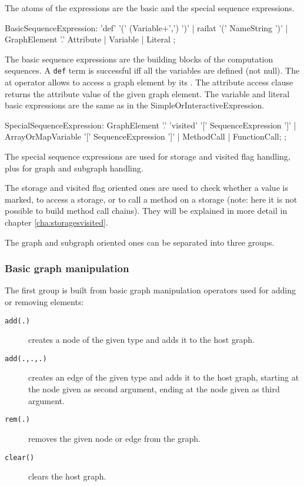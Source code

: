 The atoms of the expressions are the basic and the special sequence expressions.

\begin{rail}
  BasicSequenceExpression:
    'def' '(' (Variable+',') ')' |
	  railat '(' NameString ')' |
 	  GraphElement '.' Attribute |
	  Variable | 
    Literal
  ;
\end{rail}

The basic sequence expressions are the building blocks of the computation sequences.
A \texttt{def} term is successful iff all the variables are defined (not null).
The at operator allows to access a graph element by its .
The attribute access clause returns the attribute value of the given graph element.
The variable and literal basic expressions are the same as in the SimpleOrInteractiveExpression.

\begin{rail}
  SpecialSequenceExpression:
    GraphElement '.' 'visited' '[' SequenceExpression ']' |
    ArrayOrMapVariable '[' SequenceExpression ']' |
    MethodCall |
    FunctionCall;
  ;
\end{rail}

The special sequence expressions are used for storage and visited flag handling, plus for graph and subgraph handling.

The storage and visited flag oriented ones are used to check whether a value is marked, to access a storage, or to call a method on a storage (note: here it is not possible to build method call chains). 
They will be explained in more detail in chapter \ref{cha:storagesvisited}.

The graph and subgraph oriented ones can be separated into three groups.

\subsubsection*{Basic graph manipulation}
The first group is built from basic graph manipulation operators used for adding or removing elements:

\begin{description}
\item[\texttt{add(.)}] creates a node of the given type and adds it to the host graph.
\item[\texttt{add(.,.,.)}] creates an edge of the given type and adds it to the host graph, starting at the node given as second argument, ending at the node given as third argument.
\item[\texttt{rem(.)}] removes the given node or edge from the graph.
\item[\texttt{clear()}] clears the host graph.
\end{description}

